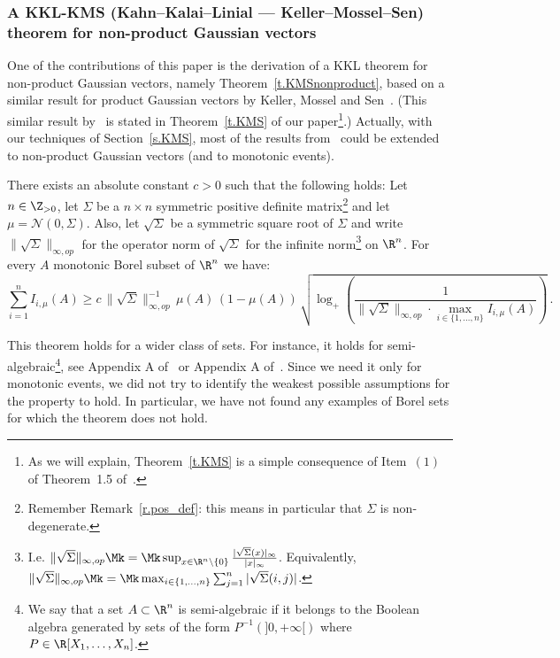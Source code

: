 \subsubsection{A KKL-KMS (Kahn--Kalai--Linial --- Keller--Mossel--Sen) theorem for non-product Gaussian vectors}\label{sss.KMS}

One of the contributions of this paper is the derivation of a KKL theorem for non-product Gaussian vectors, namely Theorem~\ref{t.KMSnonproduct}, based on a similar result for product Gaussian vectors by Keller, Mossel and Sen~\cite{keller2012geometric}. (This similar result by~\cite{keller2012geometric} is stated in Theorem~\ref{t.KMS} of our paper\footnote{As we will explain, Theorem~\ref{t.KMS} is a simple consequence of Item~$(1)$ of Theorem~1.5 of~\cite{keller2012geometric}.}.) Actually, with our techniques of Section~\ref{s.KMS}, most of the results from~\cite{keller2012geometric} could be extended to non-product Gaussian vectors (and to monotonic events).

\begin{theo}\label{t.KMSnonproduct}
There exists an absolute constant $c > 0$ such that the following holds: Let $n \in \Z_{>0}$, let $\Sigma$ be a $n \times n$ symmetric positive definite matrix\footnote{Remember Remark~\ref{r.pos_def}: this means in particular that $\Sigma$ is non-degenerate.} and let $\mu = \mathcal{N}(0,\Sigma)$. Also, let $\sqrt{\Sigma}$ be a symmetric square root of $\Sigma$ and write $\| \sqrt{\Sigma} \|_{\infty,op}$ for the operator norm of $\sqrt{\Sigma}$ for the infinite norm\footnote{I.e. $\| \sqrt{\Sigma} \|_{\infty,op} \Mk=\Mk \sup_{x\in \R^n \setminus \{0\}} \frac{|\sqrt{\Sigma}(x) |_\infty}{| x |_\infty}$. Equivalently, $\| \sqrt{\Sigma} \|_{\infty,op} \Mk=\Mk\max_{i \in \lbrace 1,\dots, n \rbrace} \sum_{j=1}^n |\sqrt{\Sigma}(i,j)|$.} on $\R^n$. For every $A$ monotonic Borel subset of $\R^n$ we have:
\[
\sum_{i=1}^n I_{i,\mu}(A) \geq c \, \| \sqrt{\Sigma} \|_{\infty,op}^{-1} \, \mu(A) \, (1-\mu(A)) \, \sqrt{\log_+ \left(\frac{1}{\| \sqrt{\Sigma} \|_{\infty,op} \cdot \max_{i \in \lbrace 1,\dots, n \rbrace} I_{i,\mu}(A)} \right)} \,.
\]
\end{theo}

This theorem holds for a wider class of sets. For instance, it holds for semi-algebraic\footnote{We say that a set $A\subset\R^n$ is semi-algebraic if it belongs to the Boolean algebra generated by sets of the form $P^{-1}\left(]0,+\infty[\right)$ where $P\in\R[X_1,\dots,X_n]$.}, see Appendix A of~\cite[Chapter~7]{alelele} or Appendix A of~\cite[Chapter~2]{hugogogo}. Since we need it only for monotonic events, we did not try to identify the weakest possible assumptions for the property to hold. In particular, we have not found any examples of Borel sets for which the theorem does not hold.

